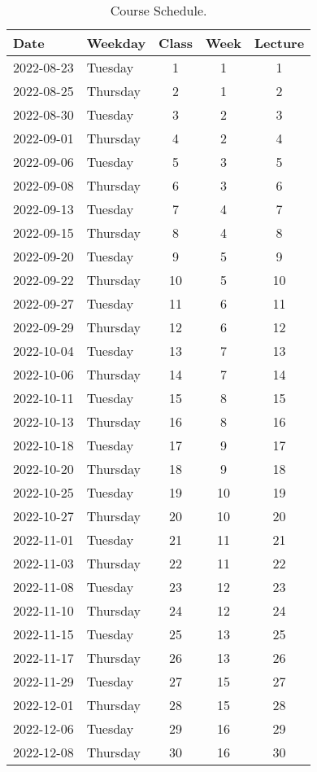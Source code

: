 \documentclass[11pt,]{article}
\begin{document}
\begin{table}[!h]

\caption{\label{tab:course_schedule}Course Schedule.}
\centering
\fontsize{10}{12}\selectfont
\begin{tabular}[t]{llccc}
\toprule
\textbf{Date} & \textbf{Weekday} & \textbf{Class} & \textbf{Week} & \textbf{Lecture}\\
\midrule
2022-08-23 & Tuesday & 1 & 1 & 1\\
2022-08-25 & Thursday & 2 & 1 & 2\\
2022-08-30 & Tuesday & 3 & 2 & 3\\
2022-09-01 & Thursday & 4 & 2 & 4\\
2022-09-06 & Tuesday & 5 & 3 & 5\\
2022-09-08 & Thursday & 6 & 3 & 6\\
2022-09-13 & Tuesday & 7 & 4 & 7\\
2022-09-15 & Thursday & 8 & 4 & 8\\
2022-09-20 & Tuesday & 9 & 5 & 9\\
2022-09-22 & Thursday & 10 & 5 & 10\\
2022-09-27 & Tuesday & 11 & 6 & 11\\
2022-09-29 & Thursday & 12 & 6 & 12\\
2022-10-04 & Tuesday & 13 & 7 & 13\\
2022-10-06 & Thursday & 14 & 7 & 14\\
2022-10-11 & Tuesday & 15 & 8 & 15\\
2022-10-13 & Thursday & 16 & 8 & 16\\
2022-10-18 & Tuesday & 17 & 9 & 17\\
2022-10-20 & Thursday & 18 & 9 & 18\\
2022-10-25 & Tuesday & 19 & 10 & 19\\
2022-10-27 & Thursday & 20 & 10 & 20\\
2022-11-01 & Tuesday & 21 & 11 & 21\\
2022-11-03 & Thursday & 22 & 11 & 22\\
2022-11-08 & Tuesday & 23 & 12 & 23\\
2022-11-10 & Thursday & 24 & 12 & 24\\
2022-11-15 & Tuesday & 25 & 13 & 25\\
2022-11-17 & Thursday & 26 & 13 & 26\\
2022-11-29 & Tuesday & 27 & 15 & 27\\
2022-12-01 & Thursday & 28 & 15 & 28\\
2022-12-06 & Tuesday & 29 & 16 & 29\\
2022-12-08 & Thursday & 30 & 16 & 30\\
\bottomrule
\end{tabular}
\end{table}
\end{document}
